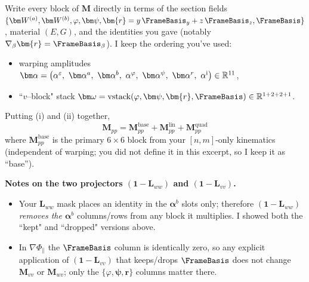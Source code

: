 Write every block of \(\mathbf M\) directly in terms of the section fields
\(\{\bm W^{(a)},\bm W^{(b)},\varphi,\bm\psi,\bm{r}=y\,\FrameBasis_y+z\,\FrameBasis_z,\FrameBasis\}\),
material \((E,G)\), and the identities you gave (notably \(\nabla_\beta \bm{r}=\FrameBasis_\beta\)).
I keep the ordering you’ve used:
\begin{itemize}
\item warping amplitudes \( \bm\alpha=\big(\alpha^\varepsilon,\ \bm\alpha^{a},\ \bm\alpha^{b},\ \alpha^\varphi,\ \bm\alpha^{\psi},\ \bm\alpha^{r},\ \alpha^{\rm i}\big)\in\mathbb R^{11}\),
\item ``\(v\)–block" stack \(\bm\omega=\operatorname{vstack}(\varphi,\bm\psi,\bm{r},\FrameBasis)\in\mathbb R^{1+2+2+1}\).
\end{itemize}


Putting (i) and (ii) together,
\[
\boxed{\ 
\mathbf M_{pp}=\mathbf M_{pp}^{\text{base}}+\mathbf M_{pp}^{\text{lin}}+\mathbf M_{pp}^{\text{quad}}\ }
\]
where \(\mathbf M_{pp}^{\text{base}}\) is the primary \(6\times 6\) block from your \([n,m]\)-only kinematics (independent of warping; you did not define it in this excerpt, so I keep it as ``base'').  


\bigskip
\noindent\textbf{Notes on the two projectors \((\mathbf{1}-\mathbf L_{ww})\) and \((\mathbf{1}-\mathbf L_{vv})\).}
\begin{itemize}
\item Your \(\mathbf L_{ww}\) mask places an identity in the \(\bm\alpha^{b}\) slots only; therefore \((\mathbf{1}-\mathbf L_{ww})\) \emph{removes the \(\bm\alpha^{b}\)} columns/rows from any block it multiplies. I showed both the ``kept" and ``dropped" versions above.
\item In \(\nabla\Phi_{\parallel}\) the \(\FrameBasis\) column is identically zero, so any explicit application of \((\mathbf{1}-\mathbf L_{vv})\) that keeps/drops \(\FrameBasis\) does not change \(\mathbf M_{vv}\) or \(\mathbf M_{wv}\); only the \(\{\varphi,\bm\psi,\bm{r}\}\) columns matter there.
\end{itemize}
